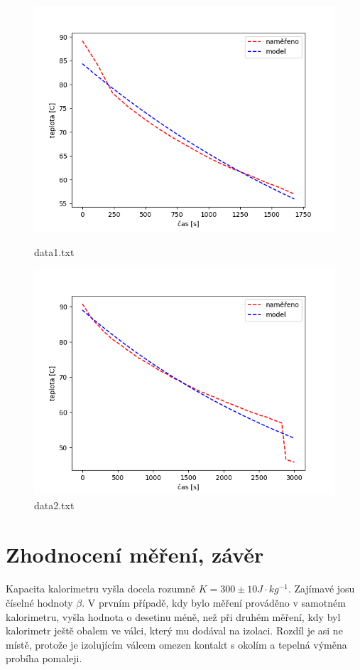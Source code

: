 \documentclass[a4paper,11pt]{article}
\begin{document}
    \begin{figure}[h!]
        \centering
        \includegraphics[width=0.7\linewidth]{data1.png}
        \caption{data1.txt}
        \includegraphics[width=0.7\linewidth]{data2.png}
        \caption{data2.txt}
    \end{figure}

\section{Zhodnocení měření, závěr}

    \paragraph{} Kapacita kalorimetru vyšla docela rozumně $K = 300 \pm 10 J \cdot kg^{-1}$.
    Zajímavé josu číselné hodnoty $\beta$. V prvním případě, kdy bylo měření prováděno
    v samotném kalorimetru, vyšla hodnota o desetinu méně, než při druhém měření,
    kdy byl kalorimetr ještě obalem ve válci, který mu dodával na izolaci. Rozdíl
    je asi ne místě, protože je izolujícím válcem omezen kontakt s okolím a 
    tepelná výměna probíha pomaleji.
\end{document}
